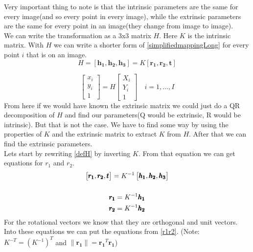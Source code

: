 Very important thing to note is that the intrinsic parameters are the same for every image(and so every point in every image), while the extrinsic parameters are the same for every point in an image(they change from image to image). \\
We can write the transformation as a 3x3 matrix $H$. Here $K$ is the intrinsic matrix. With $H$ we can write a shorter form of \ref{simplifiedmappingLong} for every point $i$ that is on an image. 
\begin{equation}
H=[\pmb{h_1}, \pmb{h_2}, \pmb{h_3}]=K[\pmb{r_1}, \pmb{r_2}, \pmb{t}]
\label{defH}
\end{equation}

\begin{equation}
    \begin{bmatrix}
        x_i \\
        y_i \\
        1 
    \end{bmatrix}
    =
    H
    \begin{bmatrix}
        X_i \\
        Y_i \\
        1 
    \end{bmatrix}
    \quad
    i=1,...,I
    \label{simMap}
\end{equation}
From here if we would have known the extrinsic matrix we could just do a QR decomposition of $H$ and find our parameters(Q would be extrinsic, R would be intrinsic). But that is not the case. We have to find some way by using the properties of $K$ and the extrinsic matrix to extract $K$ from $H$. After that we can find the extrinsic parameters. \\
Lets start by rewriting \ref{defH} by inverting $K$. From that equation we can get equations for $r_1$ and $r_2$.
\begin{gather}
    \begin{bmatrix}
        \pmb{r_1}, \pmb{r_2}, \pmb{t}
    \end{bmatrix}
    =
    K^{-1}
    \begin{bmatrix}
        \pmb{h_1}, \pmb{h_2}, \pmb{h_3}
    \end{bmatrix}   \notag\\
    \notag\\
    \pmb{r_1}=K^{-1}\pmb{h_1} \notag\\
    \pmb{r_2}=K^{-1}\pmb{h_2}
    \label{r1r2}
\end{gather}
For the rotational vectors we know that they are orthogonal and unit vectors. Into these equations we can put the equations from \ref{r1r2}. (Note: $K^{-T}=(K^{-1})^T$ and $\|\pmb{r_1}\|=\pmb{r_1}^T \pmb{r_1}$)
